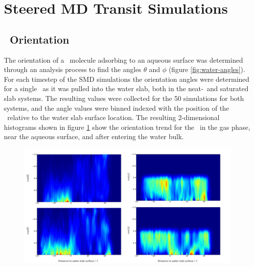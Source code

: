 \section{Steered MD Transit Simulations}

\subsection {\suldiox~Orientation}

	The orientation of a \suldiox~molecule adsorbing to an aqueous surface was determined through an analysis process to find the angles $\theta$ and $\phi$ (figure \ref{fig:water-angles}). For each timestep of the SMD simulations the orientation angles were determined for a single \suldiox~as it was pulled into the water slab, both in the neat-\wat~and saturated slab systems. The resulting values were collected for the 50 simulations for both systems, and the angle values were binned indexed with the position of the \suldiox~relative to the water slab surface location. The resulting 2-dimensional histograms shown in figure \ref{fig:so2-transit-angles} show the orientation trend for the \suldiox~in the gas phase, near the aqueous surface, and after entering the water bulk.

\begin{figure}[h!]
	\begin{center}
		\includegraphics[scale=1.0]{images/so2transitorientationsmall.png}
		\caption{}
		\label{fig:so2-transit-angles}
	\end{center}
\end{figure}


